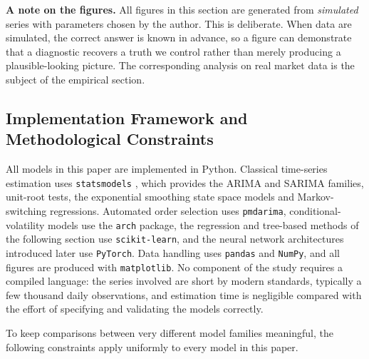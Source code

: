 \documentclass[12pt,a4paper]{article}
\begin{document}
\medskip
\noindent\textbf{A note on the figures.} All figures in this section are
generated from \emph{simulated} series with parameters chosen by the author.
This is deliberate. When data are simulated, the correct answer is known in
advance, so a figure can demonstrate that a diagnostic recovers a truth we
control rather than merely producing a plausible-looking picture. The
corresponding analysis on real market data is the subject of the empirical
section.

\subsection{Implementation Framework and Methodological Constraints}

All models in this paper are implemented in Python. Classical time-series
estimation uses \texttt{statsmodels} \cite{Seabold_2010}, which provides the
ARIMA and SARIMA families, unit-root tests, the exponential smoothing state
space models and Markov-switching regressions. Automated order selection uses
\texttt{pmdarima}, conditional-volatility models use the \texttt{arch}
package, the regression and tree-based methods of the following section use
\texttt{scikit-learn}, and the neural network architectures introduced later
use \texttt{PyTorch}. Data handling uses \texttt{pandas} and \texttt{NumPy},
and all figures are produced with \texttt{matplotlib}. No component of the
study requires a compiled language: the series involved are short by modern
standards, typically a few thousand daily observations, and estimation time is
negligible compared with the effort of specifying and validating the models
correctly.

To keep comparisons between very different model families meaningful, the
following constraints apply uniformly to every model in this paper.
\end{document}
